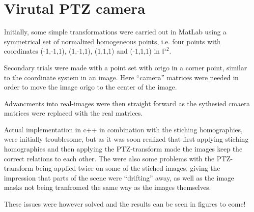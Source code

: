 \section{Virutal PTZ camera}
Initially, some simple transformations were carried out in MatLab using a symmetrical set of normalized homogeneous points, i.e. four points with coordinates (-1,-1,1), (1,-1,1), (1,1,1) and (-1,1,1) in $\mathbb{P}^2$. 

Secondary trials were made with a point set with origo in a corner point, similar to the coordinate system in an image. Here ``camera'' matrices were needed in order to move the image origo to the center of the image. 

Advancments into real-images were then straight forward as the sythesied cmaera matrices were replaced with the real matrices. 

Actual implementation in c++ in combination with the stiching homographies, were initially troublesome, but as it was soon realized that first applying stiching homographies and then applying the PTZ-transform made the images keep the correct relations to each other. The were also some problems with the PTZ-transform being applied twice on some of the stiched images, giving the impression that parts of the scene were ``drifting'' away, as well as the image masks not being tranfromed the same way as the images themselves.

These issues were however solved and the results can be seen in figures to come!
